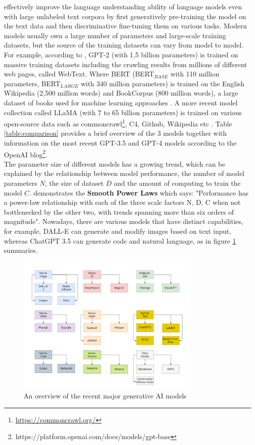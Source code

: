 \documentclass[runningheads]{llncs}
\begin{document}
effectively improve the language understanding ability of language models even with large unlabeled text corpora by first generatively pre-training the model on the text data and then discriminative fine-tuning them on various tasks.
Modern models usually own a large number of parameters and large-scale training datasets, but the source of the training datasets can vary from model to model. For example, 
according to \cite{Radford19}, GPT-2 (with 1,5 billion parameters) is trained on massive training datasets including the crawling results from millions of different web pages, called WebText. Where BERT (BERT$_{BASE}$ with 110 million
parameters, BERT$_{LARGE}$ with 340 million parameters) is trained on the English Wikipedia (2,500 million words) and BookCorpus (800 million words), a large dataset of books used for machine learning approaches \cite{Devlin18}. 
A more recent model collection called LLaMA (with 7 to 65 billion parameters) is trained on various open-source data such as commoncrawl\footnote{\url{https://commoncrawl.org/}}, C4, Github, Wikipedia etc \cite{Touvron23}. 
Table \ref{table:comparison} provides a brief overview of the 3 models together with information on the most recent GPT-3.5 and GPT-4 models according to the OpenAI blog\footnote{https://platform.openai.com/docs/models/gpt-base}. \\

\noindent
The parameter size of different models has a growing trend, which can be explained by the relationship between model performance, the number of model parameters $N$, the size of dataset $D$ and the amount of computing to train the model $C$. \cite{Kaplan20} demonstrates the \textbf{Smooth Power Laws} which says:
"Performance has a power-law relationship with each of the three scale factors N, D, C when not bottlenecked by the other two, with trends spanning more than six orders of magnitude". Nowadays, there are various models
that have distinct capabilities, for example, DALL-E can generate and modify images based on text input, whereas ChatGPT 3.5 can generate code and natural language, as \cite{Gozalo23} in figure \ref{fig:model_overview} summaries.
\noindent \newline
\begin{figure}[]
  \centering
  \includegraphics[width=0.8\textwidth]{models overview.png}
  \caption{An overview of the recent major generative AI models  \cite{Gozalo23}}
  \label{fig:model_overview}
\end{figure} 
\end{document}
